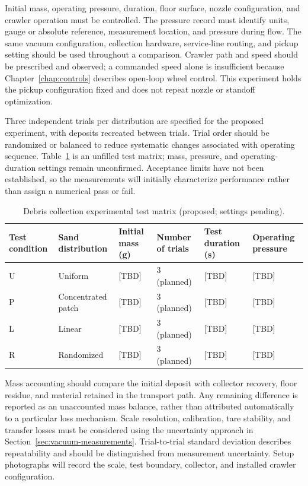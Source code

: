Initial mass, operating pressure, duration, floor surface, nozzle configuration, and crawler operation must be controlled. The pressure record must identify units, gauge or absolute reference, measurement location, and pressure during flow. The same vacuum configuration, collection hardware, service-line routing, and pickup setting should be used throughout a comparison. Crawler path and speed should be prescribed and observed; a commanded speed alone is insufficient because Chapter~\ref{chap:controls} describes open-loop wheel control. This experiment holds the pickup configuration fixed and does not repeat nozzle or standoff optimization.

Three independent trials per distribution are specified for the proposed experiment, with deposits recreated between trials. Trial order should be randomized or balanced to reduce systematic changes associated with operating sequence. Table~\ref{tab:collection-matrix} is an unfilled test matrix; mass, pressure, and operating-duration settings remain unconfirmed. Acceptance limits have not been established, so the measurements will initially characterize performance rather than assign a numerical pass or fail.

\begin{table}[H]\centering
\caption{Debris collection experimental test matrix (proposed; settings pending).}
\label{tab:collection-matrix}
\begingroup\footnotesize\singlespacing\renewcommand{\arraystretch}{1.25}
\begin{tabularx}{\textwidth}{@{}XXXXXX@{}}\toprule
Test condition & Sand distribution & Initial mass (g) & Number of trials & Test duration (s) & Operating pressure \\\midrule
U & Uniform & [TBD] & 3 (planned) & [TBD] & [TBD] \\
P & Concentrated patch & [TBD] & 3 (planned) & [TBD] & [TBD] \\
L & Linear & [TBD] & 3 (planned) & [TBD] & [TBD] \\
R & Randomized & [TBD] & 3 (planned) & [TBD] & [TBD] \\
\bottomrule\end{tabularx}\endgroup
\par{}
\end{table}

Mass accounting should compare the initial deposit with collector recovery, floor residue, and material retained in the transport path. Any remaining difference is reported as an unaccounted mass balance, rather than attributed automatically to a particular loss mechanism. Scale resolution, calibration, tare stability, and transfer losses must be considered using the uncertainty approach in Section~\ref{sec:vacuum-measurements}. Trial-to-trial standard deviation describes repeatability and should be distinguished from measurement uncertainty. Setup photographs will record the scale, test boundary, collector, and installed crawler configuration.



